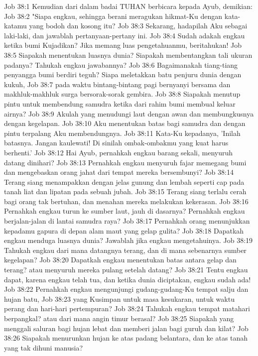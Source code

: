 Job 38:1  Kemudian dari dalam badai TUHAN berbicara kepada Ayub, demikian:
Job 38:2  "Siapa engkau, sehingga berani meragukan hikmat-Ku dengan kata-katamu yang bodoh dan kosong itu?
Job 38:3  Sekarang, hadapilah Aku sebagai laki-laki, dan jawablah pertanyaan-pertany ini.
Job 38:4  Sudah adakah engkau ketika bumi Kujadikan? Jika memang luas pengetahuanmu, beritahukan!
Job 38:5  Siapakah menentukan luasnya dunia? Siapakah membentangkan tali ukuran padanya? Tahukah engkau jawabannya?
Job 38:6  Bagaimanakah tiang-tiang penyangga bumi berdiri teguh? Siapa meletakkan batu penjuru dunia dengan kukuh,
Job 38:7  pada waktu bintang-bintang pagi bernyanyi bersama dan makhluk-makhluk surga bersorak-sorak gembira.
Job 38:8  Siapakah menutup pintu untuk membendung samudra ketika dari rahim bumi membual keluar airnya?
Job 38:9  Akulah yang menudungi laut dengan awan dan membungkusnya dengan kegelapan.
Job 38:10  Aku menentukan batas bagi samudra dan dengan pintu terpalang Aku membendungnya.
Job 38:11  Kata-Ku kepadanya, 'Inilah batasnya. Jangan kaulewati! Di sinilah ombak-ombakmu yang kuat harus berhenti.'
Job 38:12  Hai Ayub, pernahkah engkau barang sekali, menyuruh datang dinihari?
Job 38:13  Pernahkah engkau menyuruh fajar memegang bumi dan mengebaskan orang jahat dari tempat mereka bersembunyi?
Job 38:14  Terang siang menampakkan dengan jelas gunung dan lembah seperti cap pada tanah liat dan lipatan pada sebuah jubah.
Job 38:15  Terang siang terlalu cerah bagi orang tak bertuhan, dan menahan mereka melakukan kekerasan.
Job 38:16  Pernahkah engkau turun ke sumber laut, jauh di dasarnya? Pernahkah engkau berjalan-jalan di lantai samudra raya?
Job 38:17  Pernahkah orang menunjukkan kepadamu gapura di depan alam maut yang gelap gulita?
Job 38:18  Dapatkah engkau menduga luasnya dunia? Jawablah jika engkau mengetahuinya.
Job 38:19  Tahukah engkau dari mana datangnya terang, dan di mana sebenarnya sumber kegelapan?
Job 38:20  Dapatkah engkau menentukan batas antara gelap dan terang? atau menyuruh mereka pulang setelah datang?
Job 38:21  Tentu engkau dapat, karena engkau telah tua, dan ketika dunia diciptakan, engkau sudah ada!
Job 38:22  Pernahkah engkau mengunjungi gudang-gudang-Ku tempat salju dan hujan batu,
Job 38:23  yang Kusimpan untuk masa kesukaran, untuk waktu perang dan hari-hari pertempuran?
Job 38:24  Tahukah engkau tempat matahari berpangkal? atau dari mana angin timur berasal?
Job 38:25  Siapakah yang menggali saluran bagi hujan lebat dan memberi jalan bagi guruh dan kilat?
Job 38:26  Siapakah menurunkan hujan ke atas padang belantara, dan ke atas tanah yang tak dihuni manusia?
